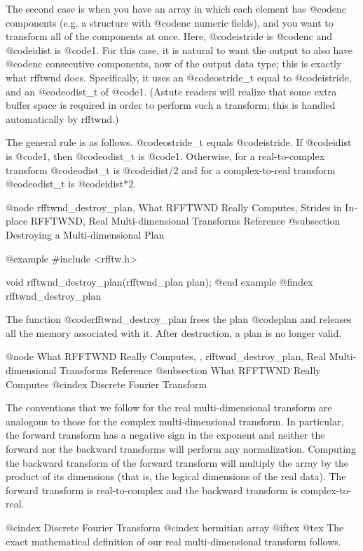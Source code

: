The second case is when you have an array in which each element has
@code{nc} components (e.g. a structure with @code{nc} numeric fields),
and you want to transform all of the components at once.  Here,
@code{istride} is @code{nc} and @code{idist} is @code{1}.  For this
case, it is natural to want the output to also have @code{nc}
consecutive components, now of the output data type; this is exactly
what rfftwnd does.  Specifically, it uses an @code{ostride_t} equal to
@code{istride}, and an @code{odist_t} of @code{1}.  (Astute readers will
realize that some extra buffer space is required in order to perform
such a transform; this is handled automatically by rfftwnd.)

The general rule is as follows.  @code{ostride_t} equals @code{istride}.
If @code{idist} is @code{1}, then @code{odist_t} is @code{1}.
Otherwise, for a real-to-complex transform @code{odist_t} is
@code{idist/2} and for a complex-to-real transform @code{odist_t} is
@code{idist*2}.

@node    rfftwnd_destroy_plan, What RFFTWND Really Computes, Strides in In-place RFFTWND, Real Multi-dimensional Transforms Reference
@subsection Destroying a Multi-dimensional Plan

@example
#include <rfftw.h>

void rfftwnd_destroy_plan(rfftwnd_plan plan);
@end example
@findex rfftwnd_destroy_plan

The function @code{rfftwnd_destroy_plan} frees the plan @code{plan}
and releases all the memory associated with it.  After destruction,
a plan is no longer valid.

@node What RFFTWND Really Computes,  , rfftwnd_destroy_plan, Real Multi-dimensional Transforms Reference
@subsection What RFFTWND Really Computes
@cindex Discrete Fourier Transform

The conventions that we follow for the real multi-dimensional transform
are analogous to those for the complex multi-dimensional transform. In
particular, the forward transform has a negative sign in the exponent
and neither the forward nor the backward transforms will perform any
normalization.  Computing the backward transform of the forward
transform will multiply the array by the product of its dimensions (that
is, the logical dimensions of the real data).  The forward transform is
real-to-complex and the backward transform is complex-to-real.

@cindex Discrete Fourier Transform
@cindex hermitian array
@iftex
@tex
The exact mathematical definition of our real multi-dimensional
transform follows. 

